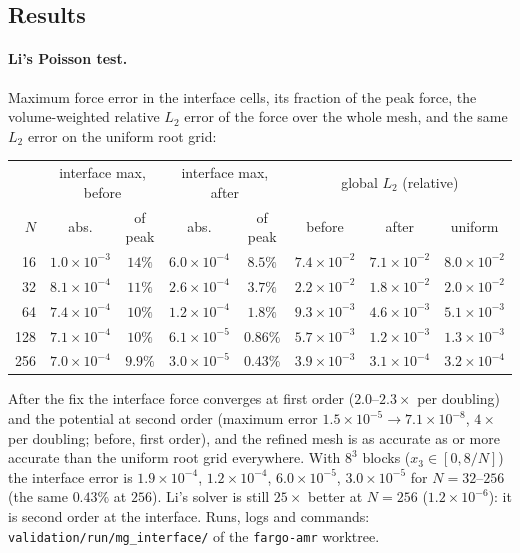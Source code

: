\documentclass[11pt]{article}
\newcommand{\code}[1]{\texttt{#1}}
\newcommand{\file}[1]{\texttt{#1}}
\begin{document}
\subsection{Results}
\paragraph{Li's Poisson test.} Maximum force error in the interface cells, its fraction of the
peak force, the volume-weighted relative $L_2$ error of the force over the whole mesh, and the
same $L_2$ error on the uniform root grid:
\begin{center}
\small
\begin{tabular}{@{}rccccccc@{}}
\toprule
& \multicolumn{2}{c}{interface max, before} & \multicolumn{2}{c}{interface max, after} &
  \multicolumn{3}{c}{global $L_2$ (relative)} \\
$N$ & abs. & of peak & abs. & of peak & before & after & uniform \\
\midrule
16  & $1.0\times10^{-3}$ & $14\%$ & $6.0\times10^{-4}$ & $8.5\%$  & $7.4\times10^{-2}$ & $7.1\times10^{-2}$ & $8.0\times10^{-2}$ \\
32  & $8.1\times10^{-4}$ & $11\%$ & $2.6\times10^{-4}$ & $3.7\%$  & $2.2\times10^{-2}$ & $1.8\times10^{-2}$ & $2.0\times10^{-2}$ \\
64  & $7.4\times10^{-4}$ & $10\%$ & $1.2\times10^{-4}$ & $1.8\%$  & $9.3\times10^{-3}$ & $4.6\times10^{-3}$ & $5.1\times10^{-3}$ \\
128 & $7.1\times10^{-4}$ & $10\%$ & $6.1\times10^{-5}$ & $0.86\%$ & $5.7\times10^{-3}$ & $1.2\times10^{-3}$ & $1.3\times10^{-3}$ \\
256 & $7.0\times10^{-4}$ & $9.9\%$ & $3.0\times10^{-5}$ & $0.43\%$ & $3.9\times10^{-3}$ & $3.1\times10^{-4}$ & $3.2\times10^{-4}$ \\
\bottomrule
\end{tabular}
\end{center}
After the fix the interface force converges at first order ($2.0$--$2.3\times$ per doubling)
and the potential at second order (maximum error $1.5\times10^{-5} \to 7.1\times10^{-8}$,
$4\times$ per doubling; before, first order), and the refined mesh is as accurate as or more
accurate than the uniform root grid everywhere. With $8^3$ blocks ($x_3 \in [0, 8/N]$) the
interface error is $1.9\times10^{-4}$, $1.2\times10^{-4}$, $6.0\times10^{-5}$,
$3.0\times10^{-5}$ for $N = 32$--$256$ (the same $0.43\%$ at $256$). Li's solver is still
$25\times$ better at $N = 256$ ($1.2\times10^{-6}$): it is second order at the interface.
Runs, logs and commands: \file{validation/run/mg\_interface/} of the \code{fargo-amr} worktree.
\end{document}
